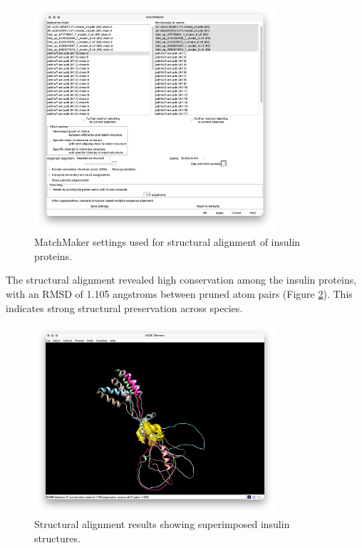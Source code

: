 \documentclass[11pt, a4paper, hidelinks]{article}
\begin{document}
\begin{figure}[H]
    \centering
    \includegraphics[width=0.8\textwidth]{AAA59172.1/_img/match maker settings}
    \caption{MatchMaker settings used for structural alignment of insulin proteins.}
    \label{fig:matchmaker-settings}
\end{figure}

The structural alignment revealed high conservation among the insulin proteins, with an RMSD of 1.105 angstroms between pruned atom pairs (Figure \ref{fig:alignment-results}). This indicates strong structural preservation across species.

\begin{figure}[H]
    \centering
    \includegraphics[width=0.8\textwidth]{AAA59172.1/_img/match maker results}
    \caption{Structural alignment results showing superimposed insulin structures.}
    \label{fig:alignment-results}
\end{figure}
\end{document}
